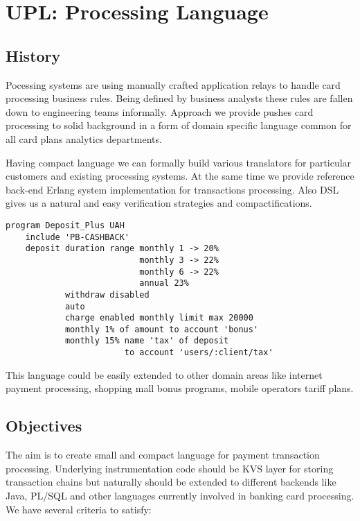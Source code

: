 \section{UPL: Processing Language}

\subsection{History}

Pocessing systems are using manually crafted application
relays to handle card processing business rules. Being defined by business
analysts these rules are fallen down to engineering teams informally.
Approach we provide pushes card processing to solid background in a form
of domain specific language common for all card plans analytics departments.

Having compact language we can formally build various translators
for particular customers and existing processing systems. At the same time
we provide reference back-end Erlang system implementation
for transactions processing. Also DSL gives us a natural and easy
verification strategies and compactifications.

\vspace{1\baselineskip}
\begin{lstlisting}[caption=Deposit Program]
    program Deposit_Plus UAH
    include 'PB-CASHBACK'
    deposit duration range monthly 1 -> 20%
                           monthly 3 -> 22%
                           monthly 6 -> 22%
                           annual 23%
            withdraw disabled
            auto
            charge enabled monthly limit max 20000
            monthly 1% of amount to account 'bonus'
            monthly 15% name 'tax' of deposit 
                        to account 'users/:client/tax'
\end{lstlisting}
\vspace{1\baselineskip}

This language could be easily extended to other domain areas like
internet payment processing, shopping mall bonus programs, mobile
operators tariff plans.

\newpage
\subsection{Objectives}

The aim is to create small and compact language for payment
transaction processing. Underlying instrumentation
code should be KVS layer for storing transaction chains but
naturally should be extended to different backends like Java,
PL/SQL and other languages currently involved in banking card processing.
We have several criteria to satisfy:

